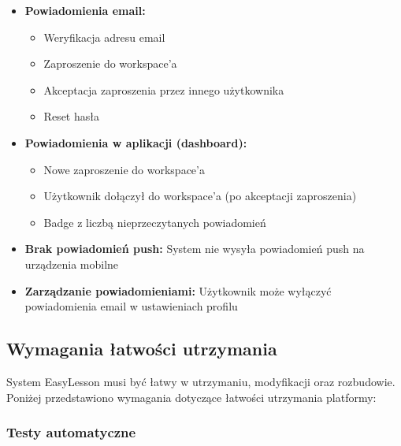 \documentclass[12pt,a4paper]{article}
\begin{document}
\begin{itemize}[leftmargin=*]
    \item \textbf{Powiadomienia email:}
    \begin{itemize}
        \item Weryfikacja adresu email
        \item Zaproszenie do workspace'a
        \item Akceptacja zaproszenia przez innego użytkownika
        \item Reset hasła
    \end{itemize}
    \item \textbf{Powiadomienia w aplikacji (dashboard):}
    \begin{itemize}
        \item Nowe zaproszenie do workspace'a
        \item Użytkownik dołączył do workspace'a (po akceptacji zaproszenia)
        \item Badge z liczbą nieprzeczytanych powiadomień
    \end{itemize}
    \item \textbf{Brak powiadomień push:} System nie wysyła powiadomień push na urządzenia mobilne
    \item \textbf{Zarządzanie powiadomieniami:} Użytkownik może wyłączyć powiadomienia email w ustawieniach profilu
\end{itemize}

\subsection{Wymagania łatwości utrzymania}

System EasyLesson musi być łatwy w utrzymaniu, modyfikacji oraz rozbudowie. Poniżej przedstawiono wymagania dotyczące łatwości utrzymania platformy:

\subsubsection{Testy automatyczne}
\end{document}
